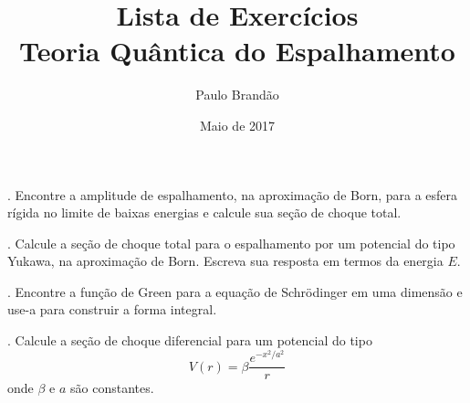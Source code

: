 \documentclass{article}
\title{\color{astral}\textbf{Lista de Exercícios} \\ \textbf{Teoria Quântica do Espalhamento}}
\author{Paulo Brandão}
\date{Maio de 2017}
\begin{document}
\maketitle


. Encontre a amplitude de espalhamento, na aproximação de Born, para a esfera rígida no limite de baixas energias e calcule sua seção de choque total.

\vspace{1cm}

. Calcule a seção de choque total para o espalhamento por um potencial do tipo Yukawa, na aproximação de Born. Escreva sua resposta em termos da energia $E$.

\vspace{1cm}

. Encontre a função de Green para a equação de Schrödinger em uma dimensão e use-a para construir a forma integral.

\vspace{1cm}

. Calcule a seção de choque diferencial para um potencial do tipo 
\begin{equation}
    V(r) = \beta \frac{e^{-x^2/a^2}}{r}
\end{equation}
onde $\beta$ e $a$ são constantes.
\vspace{1cm}
\end{document}
